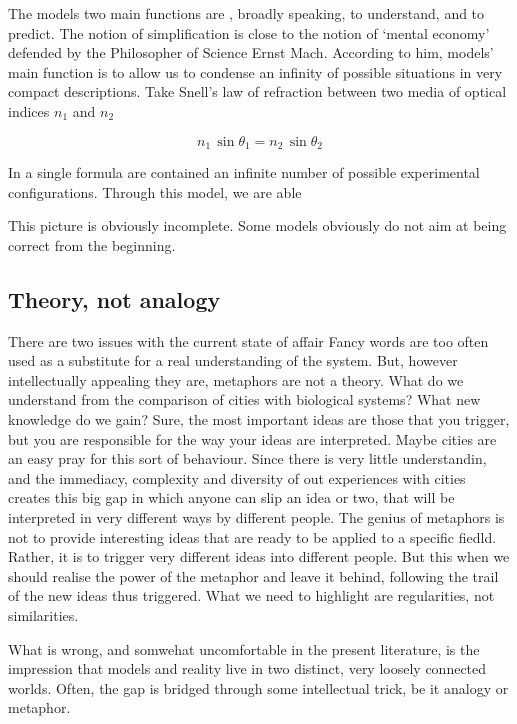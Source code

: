 The models two main functions are , broadly speaking, to understand, and to
predict.  The notion of simplification is close to the notion of `mental
economy' defended by the Philosopher of Science Ernst Mach.  According to him,
models' main function is to allow us to condense an infinity of possible
situations in very compact descriptions. Take Snell's law of refraction between
two media of optical indices $n_1$ and $n_2$

\begin{equation}
    n_1\,\sin \theta_1 = n_2\,\sin \theta_2
\end{equation}

In a single formula are contained an infinite number of possible experimental
configurations. Through this model, we are able

This picture is obviously incomplete. Some models obviously do not aim at being
correct from the beginning.

\subsection{Theory, not analogy}
\label{sub:theory_not_analogy}




There are two issues with the current state of affair 
Fancy words are too often used as a substitute for a real
understanding of the system. But, however intellectually appealing they are,
metaphors are not a theory. What do we understand from the comparison of cities
with biological systems? What new knowledge do we gain? Sure, the most important
ideas are those that you trigger, but you are responsible for the way your ideas
are interpreted.  Maybe cities are an easy pray for this sort of behaviour.
Since there is very little understandin, and the immediacy, complexity and
diversity of out experiences with cities creates this big gap in which anyone
can slip an idea or two, that will be interpreted in very different ways by
different people. The genius of metaphors is not to provide interesting ideas
that are ready to be applied to a specific fiedld. Rather, it is to trigger very
different ideas into different people. But this when we should realise the power
of the metaphor and leave it behind, following the trail of the new ideas thus
triggered. What we need to highlight are regularities, not similarities.

What is wrong, and somwehat uncomfortable in the present literature, is the
impression that models and reality live in two distinct, very loosely connected
worlds. Often, the gap is bridged through some intellectual trick, be it analogy
or metaphor.

